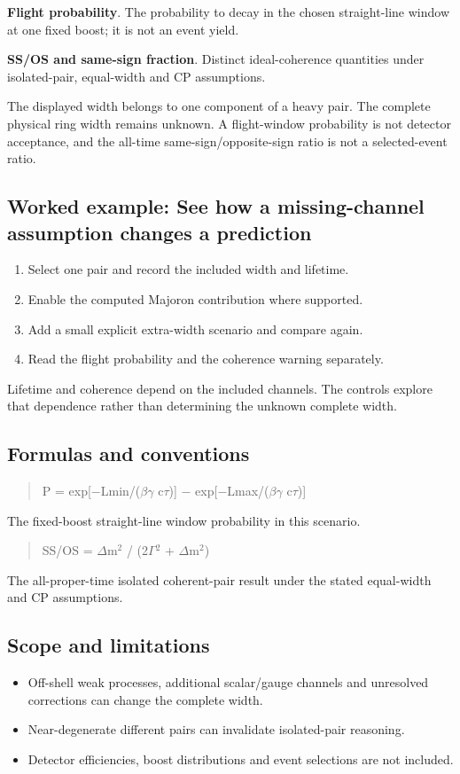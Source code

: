\documentclass[11pt,a4paper]{article}
\begin{document}
\textbf{Flight probability}. The probability to decay in the chosen straight-line window at one fixed boost; it is not an event yield.

\textbf{SS/OS and same-sign fraction}. Distinct ideal-coherence quantities under isolated-pair, equal-width and CP assumptions.

The displayed width belongs to one component of a heavy pair. The complete physical ring width remains unknown. A flight-window probability is not detector acceptance, and the all-time same-sign/opposite-sign ratio is not a selected-event ratio.
\subsection*{Worked example: See how a missing-channel assumption changes a prediction}
\begin{enumerate}
\item Select one pair and record the included width and lifetime.
\item Enable the computed Majoron contribution where supported.
\item Add a small explicit extra-width scenario and compare again.
\item Read the flight probability and the coherence warning separately.
\end{enumerate}
Lifetime and coherence depend on the included channels. The controls explore that dependence rather than determining the unknown complete width.
\subsection*{Formulas and conventions}
\begin{quote}P = exp[\ensuremath{-}Lmin/(\ensuremath{\beta}\ensuremath{\gamma} c\ensuremath{\tau})] \ensuremath{-} exp[\ensuremath{-}Lmax/(\ensuremath{\beta}\ensuremath{\gamma} c\ensuremath{\tau})]\end{quote}
The fixed-boost straight-line window probability in this scenario.

\begin{quote}SS/OS = \ensuremath{\Delta}m\ensuremath{{}^{2}} / (2\ensuremath{\Gamma}\ensuremath{{}^{2}} + \ensuremath{\Delta}m\ensuremath{{}^{2}})\end{quote}
The all-proper-time isolated coherent-pair result under the stated equal-width and CP assumptions.

\subsection*{Scope and limitations}
\begin{itemize}
\item Off-shell weak processes, additional scalar/gauge channels and unresolved corrections can change the complete width.
\item Near-degenerate different pairs can invalidate isolated-pair reasoning.
\item Detector efficiencies, boost distributions and event selections are not included.
\end{itemize}
\end{document}
